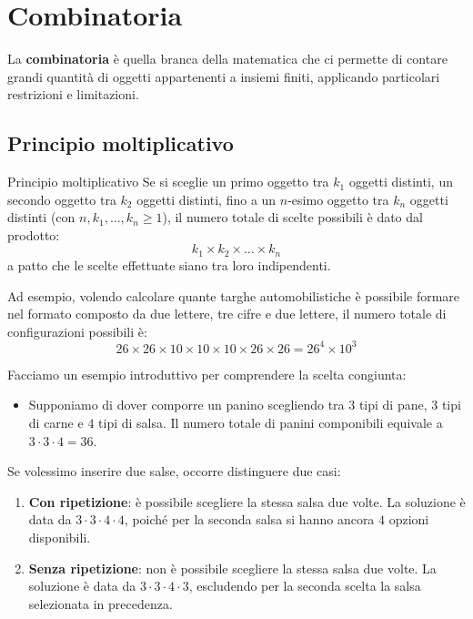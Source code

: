 \documentclass[12pt]{report}
\begin{document}
	\chapter{Combinatoria}
	
	La \textbf{combinatoria} è quella branca della matematica che ci permette di contare grandi quantità di oggetti appartenenti a insiemi finiti, applicando particolari restrizioni e limitazioni.
	
	\section{Principio moltiplicativo}
	
	\begin{definizione}{Principio moltiplicativo}{}
		Se si sceglie un primo oggetto tra $k_1$ oggetti distinti, un secondo oggetto tra $k_2$ oggetti distinti, fino a un $n$-esimo oggetto tra $k_n$ oggetti distinti (con $n, k_1, \dots, k_n \ge 1$), il numero totale di scelte possibili è dato dal prodotto:
		\[
		k_1 \times k_2 \times \dots \times k_n
		\]
		a patto che le scelte effettuate siano tra loro indipendenti.
	\end{definizione}
	
	Ad esempio, volendo calcolare quante targhe automobilistiche è possibile formare nel formato composto da due lettere, tre cifre e due lettere, il numero totale di configurazioni possibili è:
	\[
	26 \times 26 \times 10 \times 10 \times 10 \times 26 \times 26 = 26^4 \times 10^3
	\]
	
	Facciamo un esempio introduttivo per comprendere la scelta congiunta:
	\begin{itemize}
		\item Supponiamo di dover comporre un panino scegliendo tra $3$ tipi di pane, $3$ tipi di carne e $4$ tipi di salsa. Il numero totale di panini componibili equivale a $3 \cdot 3 \cdot 4 = 36$.
	\end{itemize}
	
	Se volessimo inserire due salse, occorre distinguere due casi:
	\begin{enumerate}
		\item \textbf{Con ripetizione}: è possibile scegliere la stessa salsa due volte. La soluzione è data da $3 \cdot 3 \cdot 4 \cdot 4$, poiché per la seconda salsa si hanno ancora $4$ opzioni disponibili.
		\item \textbf{Senza ripetizione}: non è possibile scegliere la stessa salsa due volte. La soluzione è data da $3 \cdot 3 \cdot 4 \cdot 3$, escludendo per la seconda scelta la salsa selezionata in precedenza.
	\end{enumerate}
	
\end{document}
